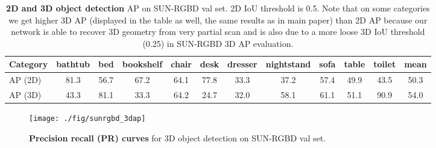\documentclass[10pt,twocolumn,letterpaper]{article}
\begin{document}
\begin{table*}[]
    \centering
    \begin{tabular}{l|cccccccccc|c}
    \hline
    Category & bathtub & bed & bookshelf & chair & desk & dresser & nightstand & sofa & table & toilet & mean \\ \hline
         AP (2D) & 81.3 & 56.7 & 67.2 & 64.1 & 77.8 & 33.3 & 37.2 & 57.4 & 49.9 & 43.5 & 50.3 \\ \hline
         AP (3D) & 43.3 & 81.1 & 33.3 & 64.2 & 24.7 & 32.0 & 58.1 & 61.1 & 51.1 & 90.9 & 54.0 \\ \hline
    \end{tabular}
    \caption{\textbf{2D and 3D object detection} AP on SUN-RGBD val set. 2D IoU threshold is 0.5. Note that on some categories we get higher 3D AP (displayed in the table as well, the same results as in main paper) than 2D AP because our network is able to recover 3D geometry from very partial scan and is also due to a more loose 3D IoU threshold (0.25) in SUN-RGBD 3D AP evaluation.}
    \label{tab:my_label}
\end{table*}


\begin{figure*}[t!]
    \centering
    \texttt{[image: ./fig/sunrgbd\_3dap]}
    \caption{\textbf{Precision recall (PR) curves} for 3D object detection on SUN-RGBD val set.}
    \label{fig:sunrgbd_ap}
\end{figure*}


 
\end{document}
